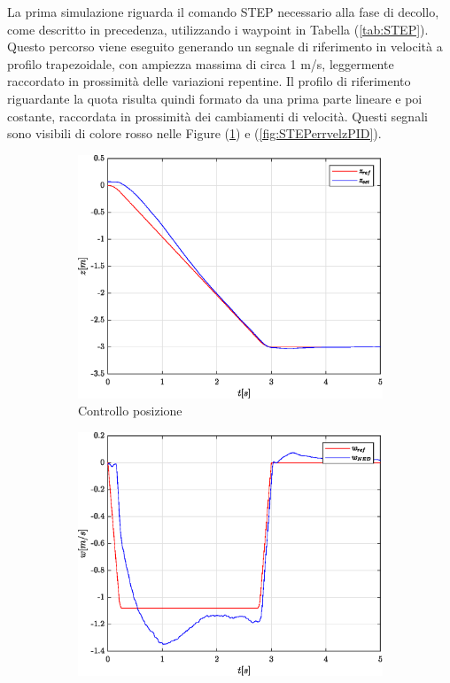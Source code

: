 La prima simulazione riguarda il comando STEP necessario alla fase di decollo, come descritto in precedenza, utilizzando i waypoint in Tabella (\ref{tab:STEP}). Questo percorso viene eseguito generando un segnale di riferimento in velocità a profilo trapezoidale, con ampiezza massima di circa 1 m/s, leggermente raccordato in prossimità delle variazioni repentine. Il profilo di riferimento riguardante la quota risulta quindi formato da una prima parte lineare e poi costante, raccordata in prossimità dei cambiamenti di velocità. Questi segnali sono visibili di colore rosso nelle Figure (\ref{fig:STEPerrposzPID}) e (\ref{fig:STEPerrvelzPID}).
\begin{figure}
	\centering
	\begin{subfigure}{0.45\textwidth}
		\centering
		\includegraphics[width=1\textwidth]{Simulazioni/Figure/PID/STEP/AltitudeControlPos}
		\caption{Controllo posizione}
		\label{fig:STEPerrposzPID}
	\end{subfigure}
	\hfill
	\begin{subfigure}{0.45\textwidth}
		\centering
		\includegraphics[width=1\textwidth]{Simulazioni/Figure/PID/STEP/AltitudeControlVel}

\end{subfigure}
\end{figure}
